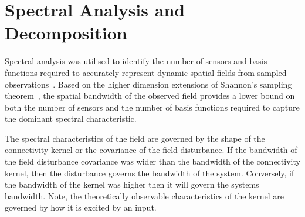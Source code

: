 \documentclass[12pt]{iopart}		%
\begin{document}
\section{Spectral Analysis and Decomposition}\label{SpectralAnalysisSection}
Spectral analysis was utilised to identify the number of sensors and basis functions required to accurately represent dynamic spatial fields from sampled observations~\cite{Sanner1992,Scerri2009}. Based on the higher dimension extensions of Shannon's sampling theorem~\cite{Peterson1962}, the spatial bandwidth of the observed field provides a lower bound on both the number of sensors and the number of basis functions required to capture the dominant spectral characteristic.

The spectral characteristics of the field are governed by the shape of the connectivity kernel or the covariance of the field disturbance. If the bandwidth of the field disturbance covariance was wider than the bandwidth of the connectivity kernel, then the disturbance governs the bandwidth of the system. Conversely, if the bandwidth of the kernel was higher then it will govern the systems bandwidth. Note, the theoretically observable characteristics of the kernel are governed by how it is excited by an input.
 
\end{document}
